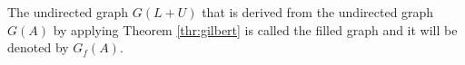 \begin{definition}\label{def:filled-graph}
The undirected graph $G(L+U)$ that is derived from the undirected graph 
$G(A)$ by applying Theorem \ref{thr:gilbert} is called the filled graph
and it will be denoted by $G_f(A)$.
\end{definition}


%
%
